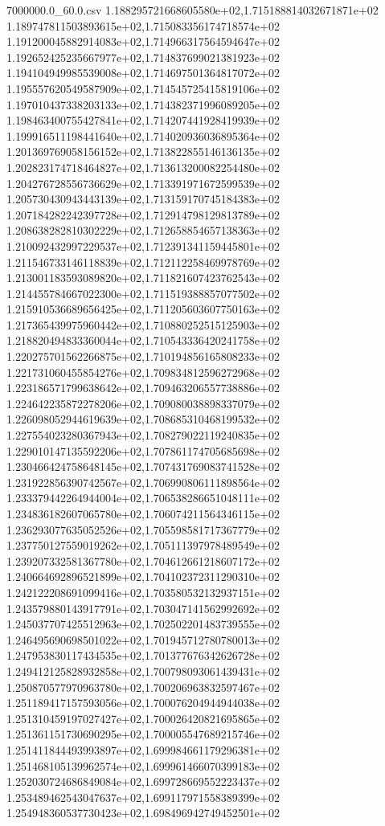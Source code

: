 \begin{filecontents*}{7000000.0_60.0.csv}
1.188295721668605580e+02,1.715188814032671871e+02
1.189747811503893615e+02,1.715083356174718574e+02
1.191200045882914083e+02,1.714966317564594647e+02
1.192652425235667977e+02,1.714837699021381923e+02
1.194104949985539008e+02,1.714697501364817072e+02
1.195557620549587909e+02,1.714545725415819106e+02
1.197010437338203133e+02,1.714382371996089205e+02
1.198463400755427841e+02,1.714207441928419939e+02
1.199916511198441640e+02,1.714020936036895364e+02
1.201369769058156152e+02,1.713822855146136135e+02
1.202823174718464827e+02,1.713613200082254480e+02
1.204276728556736629e+02,1.713391971672599539e+02
1.205730430943443139e+02,1.713159170745184383e+02
1.207184282242397728e+02,1.712914798129813789e+02
1.208638282810302229e+02,1.712658854657138363e+02
1.210092432997229537e+02,1.712391341159445801e+02
1.211546733146118839e+02,1.712112258469978769e+02
1.213001183593089820e+02,1.711821607423762543e+02
1.214455784667022300e+02,1.711519388857077502e+02
1.215910536689656425e+02,1.711205603607750163e+02
1.217365439975960442e+02,1.710880252515125903e+02
1.218820494833360044e+02,1.710543336420241758e+02
1.220275701562266875e+02,1.710194856165808233e+02
1.221731060455854276e+02,1.709834812596272968e+02
1.223186571799638642e+02,1.709463206557738886e+02
1.224642235872278206e+02,1.709080038898337079e+02
1.226098052944619639e+02,1.708685310468199532e+02
1.227554023280367943e+02,1.708279022119240835e+02
1.229010147135592206e+02,1.707861174705685698e+02
1.230466424758648145e+02,1.707431769083741528e+02
1.231922856390742567e+02,1.706990806111898564e+02
1.233379442264944004e+02,1.706538286651048111e+02
1.234836182607065780e+02,1.706074211564346115e+02
1.236293077635052526e+02,1.705598581717367779e+02
1.237750127559019262e+02,1.705111397978489549e+02
1.239207332581367780e+02,1.704612661218607172e+02
1.240664692896521899e+02,1.704102372311290310e+02
1.242122208691099416e+02,1.703580532132937151e+02
1.243579880143917791e+02,1.703047141562992692e+02
1.245037707425512963e+02,1.702502201483739555e+02
1.246495690698501022e+02,1.701945712780780013e+02
1.247953830117434535e+02,1.701377676342626728e+02
1.249412125828932858e+02,1.700798093061439431e+02
1.250870577970963780e+02,1.700206963832597467e+02
1.251189417157593056e+02,1.700076204944944038e+02
1.251310459197027427e+02,1.700026420821695865e+02
1.251361151730690295e+02,1.700005547689215746e+02
1.251411844493993897e+02,1.699984661179296381e+02
1.251468105139962574e+02,1.699961466070399183e+02
1.252030724686849084e+02,1.699728669552223437e+02
1.253489462543047637e+02,1.699117971558389399e+02
1.254948360537730423e+02,1.698496942749452501e+02

\end{filecontents*}
